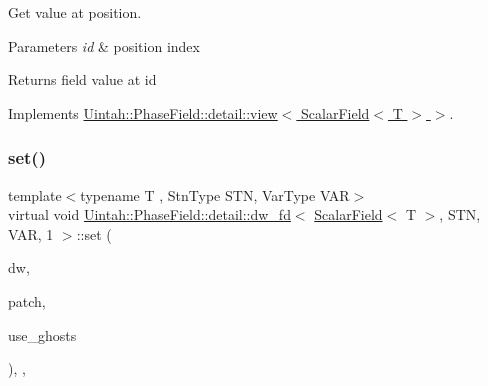 Get value at position. 


\begin{DoxyParams}{Parameters}
{\em id} & position index \\
\hline
\end{DoxyParams}
\begin{DoxyReturn}{Returns}
field value at id 
\end{DoxyReturn}


Implements \hyperlink{classUintah_1_1PhaseField_1_1detail_1_1view_3_01ScalarField_3_01T_01_4_01_4_aea43cfedfe3b6f3c038ff795caec49b8}{Uintah\+::\+Phase\+Field\+::detail\+::view$<$ Scalar\+Field$<$ T $>$ $>$}.

\mbox{\label{classUintah_1_1PhaseField_1_1detail_1_1dw__fd_3_01ScalarField_3_01T_01_4_00_01STN_00_01VAR_00_011_01_4_ae718a5d7a2210592ec2b5dbd7eab1ace}} 
\subsubsection{\texorpdfstring{set()}{set()}\hspace{0.1cm}{\footnotesize\ttfamily [1/2]}}
{\footnotesize\ttfamily template$<$typename T , Stn\+Type S\+TN, Var\+Type V\+AR$>$ \\
virtual void \hyperlink{classUintah_1_1PhaseField_1_1detail_1_1dw__fd}{Uintah\+::\+Phase\+Field\+::detail\+::dw\+\_\+fd}$<$ \hyperlink{structUintah_1_1PhaseField_1_1ScalarField}{Scalar\+Field}$<$ T $>$, S\+TN, V\+AR, 1 $>$\+::set (\begin{DoxyParamCaption}\item[{Data\+Warehouse $\ast$}]{dw,  }\item[{const Patch $\ast$}]{patch,  }\item[{bool}]{use\+\_\+ghosts }\end{DoxyParamCaption})\hspace{0.3cm}{\ttfamily [inline]}, {\ttfamily [override]}, {\ttfamily [virtual]}}



